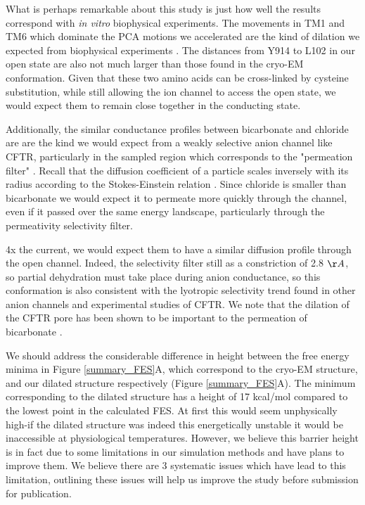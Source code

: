 What is perhaps remarkable about this study is just how well the results correspond with \textit{in vitro} biophysical experiments. The movements in TM1 and TM6 which dominate the PCA motions we accelerated are the kind of dilation we expected from biophysical experiments \cite{linsdell2016}. The distances from Y914 to L102 in our open state are also not much larger than those found in the cryo-EM conformation. Given that these two amino acids can be cross-linked by cysteine substitution, while still allowing the ion channel to access the open state, we would expect them to remain close together in the conducting state\cite{negoda2019}. 

Additionally, the similar conductance profiles between bicarbonate and chloride are are the kind we would expect from a weakly selective anion channel like CFTR, particularly in the sampled region which corresponds to the "permeation filter" \cite{}. Recall that the diffusion coefficient of a particle scales inversely with its radius according to the Stokes-Einstein relation \cite{miller1924}. Since chloride is smaller than bicarbonate we would expect it to permeate more quickly through the channel, even if it passed over the same energy landscape, particularly through the permeativity selectivity filter. 

4x the current, we would expect them to have a similar diffusion profile through the open channel. Indeed, the selectivity filter still as a constriction of 2.8 $\AA$, so partial dehydration must take place during anion conductance, so this conformation is also consistent with the lyotropic selectivity trend found in other anion channels and experimental studies of CFTR. We note that the dilation of the CFTR pore has been shown to be important to the permeation of bicarbonate \cite{jun2016, kim2019}.

We should address the considerable difference in height between the free energy minima in Figure \ref{summary_FES}A, which correspond to the cryo-EM structure, and our dilated structure respectively (Figure \ref{summary_FES}A). The minimum corresponding to the dilated structure has a height of 17 kcal/mol compared to the lowest point in the calculated FES. At first this would seem unphysically high-if the dilated structure was indeed this energetically unstable it would be inaccessible at physiological temperatures. However, we believe this barrier height is in fact due to some limitations in our simulation methods and have plans to improve them. We believe there are 3 systematic issues which have lead to this limitation, outlining these issues will help us improve the study before submission for publication. 

